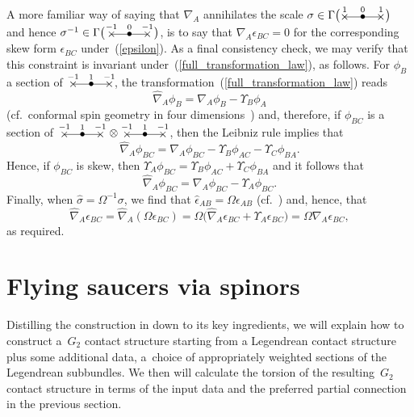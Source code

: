 \documentclass[10pt,a4paper]{amsart}
\numberwithin{equation}{section}
\newcommand{\xox}[3]{\begin{picture}(40,11)
\put(4,1.5){\makebox(0,0){$\times$}}
\put(20,1.5){\makebox(0,0){$\bullet$}}
\put(36,1.5){\makebox(0,0){$\times$}}
\put(4,1.5){\line(1,0){32}}
\put(4,8){\makebox(0,0){$\scriptstyle #1$}}
\put(20,8){\makebox(0,0){$\scriptstyle #2$}}
\put(36,8){\makebox(0,0){$\scriptstyle #3$}}
\end{picture}}
\begin{document}
A more familiar way \cite{OT} of saying that $\nabla_A$ annihilates the scale
$\sigma\in\Gamma\big(\xox{1}{0}{1}\big)$ and hence
$\sigma^{-1}\in\Gamma\big(\,\xox{-1}{0}{-1}\,\big)$, is to say that
$\nabla_A\epsilon_{BC}=0$ for the corresponding skew form $\epsilon_{BC}$
under~(\ref{epsilon}). As a final consistency check, we may verify that this
constraint is invariant under~(\ref{full_transformation_law}), as follows. For
$\phi_B$ a section of $\,\xox{-1}{1}{-1}$, the transformation~(\ref{full_transformation_law}) reads
\[\widehat\nabla_A\phi_B=\nabla_A\phi_B-\Upsilon_B\phi_A\]
(cf.~conformal spin geometry in four
dimensions~\cite[equation~(5.6.15)]{OT}) and, therefore, if $\phi_{BC}$ is a
section of $\,\xox{-1}{1}{-1}\,\otimes\,\xox{-1}{1}{-1}\,$, then the Leibniz
rule implies that
\[\widehat\nabla_A\phi_{BC}
=\nabla_A\phi_{BC}-\Upsilon_B\phi_{AC}-\Upsilon_C\phi_{BA}.\]
Hence, if $\phi_{BC}$ is skew, then
$\Upsilon_A\phi_{BC}=\Upsilon_B\phi_{AC}+\Upsilon_C\phi_{BA}$ and it follows
that
\[\widehat\nabla_A\phi_{BC}=\nabla_A\phi_{BC}-\Upsilon_A\phi_{BC}.\]
Finally, when $\widehat\sigma=\Omega^{-1}\sigma$, we find that
$\widehat{\epsilon}_{AB}=\Omega\epsilon_{AB}$ (cf.~\cite[equation~(5.6.2)]{OT})
and, hence, that
\[\widehat\nabla_A\widehat\epsilon_{BC}
=\widehat\nabla_A(\Omega\epsilon_{BC})
=\Omega\big(\widehat\nabla_A\epsilon_{BC}+\Upsilon_A\epsilon_{BC}\big)
=\Omega\nabla_A\epsilon_{BC},\]
as required.

\section{Flying saucers via spinors}\label{saucers}
Distilling the construction in \cite{EN2} down to its key ingredients, we
will explain how to construct a~$G_2$ contact structure starting from a
Legendrean contact structure plus some additional data, a~choice of
appropriately weighted sections of the Legendrean subbundles. We then will
calculate the torsion of the resulting~$G_2$ contact structure in terms of the
input data and the preferred partial connection in the previous section.
\end{document}
